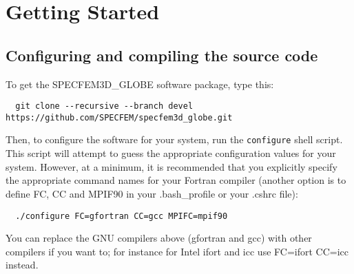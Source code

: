 
\chapter{Getting Started}\label{cha:Getting-Started}



\section{Configuring and compiling the source code}

To get the SPECFEM3D\_GLOBE software package, type this:
{\small
\begin{verbatim}
  git clone --recursive --branch devel https://github.com/SPECFEM/specfem3d_globe.git
\end{verbatim}
}
\noindent
Then, to configure the software for your system, run the
\texttt{configure} shell script. This script will attempt to guess
the appropriate configuration values for your system. However, at
a minimum, it is recommended that you explicitly specify the appropriate
command names for your Fortran compiler (another option is to define FC, CC and MPIF90 in your .bash\_profile
or your .cshrc file):
{\small
\begin{verbatim}
  ./configure FC=gfortran CC=gcc MPIFC=mpif90
\end{verbatim}
}
\noindent
You can replace the GNU compilers above (gfortran and gcc) with other compilers if you want to; for instance for Intel ifort and icc use FC=ifort CC=icc instead.\\

